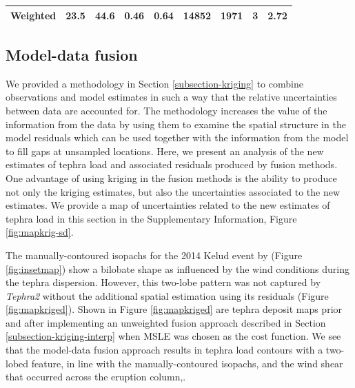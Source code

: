 {\begin{landscape}
\begin{table}[]
\begin{tabular}{crrrrrrrr}
Weighted                                                                                                   & 23.5                                                                                   & 44.6                                                                                        & 0.46                                                                            & 0.64                                                                                          & 14852                                                                                     & 1971                                                                                               & \textbf{3}                                                                              & 2.72                                                                                   \\ \hline
\end{tabular}
\end{table}
        
\end{landscape}
\clearpage%
}

\subsection{Model-data fusion}\label{subsection-res-fusion}

We provided a methodology in Section \ref{subsection-kriging} to combine observations and model estimates in such a way that the relative uncertainties between data are accounted for. The methodology increases the value of the information from the data by using them to examine the spatial structure in the model residuals which can be used together with the information from the model to fill gaps at unsampled locations. Here, we present an analysis of the new estimates of tephra load and associated residuals produced by fusion methods. One advantage of using kriging in the fusion methods is the ability to produce not only the kriging estimates, but also the uncertainties associated to the new estimates. We provide a map of uncertainties related to the new estimates of tephra load in this section in the Supplementary Information, Figure \ref{fig:mapkrig-sd}.

The manually-contoured isopachs for the 2014 Kelud event by \cite{MAENO201924} (Figure \ref{fig:insetmap}) show a bilobate shape as influenced by the wind conditions during the tephra dispersion. However, this two-lobe pattern was not captured by \textit{Tephra2} without the additional spatial estimation using its residuals (Figure \ref{fig:mapkriged}). Shown in Figure \ref{fig:mapkriged} are tephra deposit maps prior and after implementing an unweighted fusion approach described in Section \ref{subsection-kriging-interp} when MSLE was chosen as the cost function. We see that the model-data fusion approach results in tephra load contours with a two-lobed feature, in line with the manually-contoured isopachs, and the wind shear that occurred across the eruption column,.


